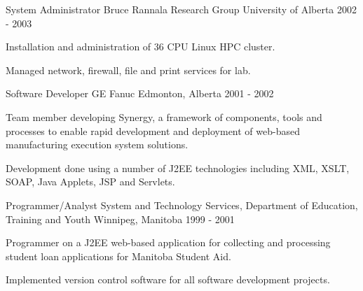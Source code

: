 \begin{cventries}
  \cventry
    {System Administrator} %
    {Bruce Rannala Research Group} %
    {University of Alberta} %
    {2002 - 2003} %
    {
      \begin{cvitems} %
        \item {Installation and administration of 36 CPU Linux HPC cluster.}
        \item {Managed network, firewall, file and print services for lab.}
      \end{cvitems}
    }

  \cventry
    {Software Developer} %
    {GE Fanuc} %
    {Edmonton, Alberta} %
    {2001 - 2002} %
    {
      \begin{cvitems} %
        \item {Team member developing Synergy, a framework of components, tools and processes to enable rapid development and deployment of web-based manufacturing execution system solutions.}
        \item {Development done using a number of J2EE technologies including XML, XSLT, SOAP, Java Applets, JSP and Servlets.}
      \end{cvitems}
    }

  \cventry
    {Programmer/Analyst} %
    {System and Technology Services, Department of Education, Training and Youth} %
    {Winnipeg, Manitoba} %
    {1999 - 2001} %
    {
      \begin{cvitems} %
        \item {Programmer on a J2EE web-based application for collecting and processing student loan applications for Manitoba Student Aid.}
        \item {Implemented version control software for all software development projects.}
      \end{cvitems}
    }

\end{cventries}
